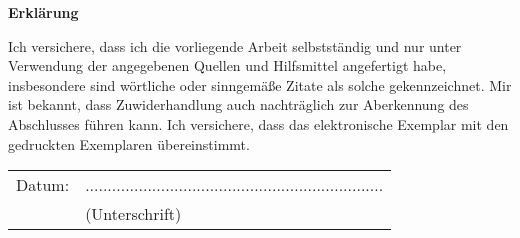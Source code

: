 \documentclass[a4paper,11pt,oneside]{book} %
\begin{document}
	\frontmatter

	
	
	\mainmatter
	
	\renewcommand{\baselinestretch}{1.05}
	\small\normalsize

	
	
	
	
	
	

	\appendix
	
	




\newpage
\thispagestyle{empty}
\begin{center}
	\vspace*{5em}
	\huge\textbf{Erklärung}\\
\end{center}
\vspace{2em}
Ich versichere, dass ich die vorliegende Arbeit selbstständig und nur unter Verwendung der angegebenen Quellen und Hilfsmittel angefertigt habe, insbesondere sind wörtliche oder sinngemäße Zitate als solche gekennzeichnet. Mir ist bekannt, dass Zuwiderhandlung auch nachträglich zur Aberkennung des Abschlusses führen kann. Ich versichere, dass das elektronische Exemplar mit den gedruckten Exemplaren übereinstimmt.

\vspace{4em}
\begin{minipage}{\linewidth}
	\centering
	\begin{tabular}{p{11.5em}C{20em}}
		Datum: &  ...................................................................\\
		& \centering (Unterschrift)\\
	\end{tabular}
\end{minipage}
\end{document}
